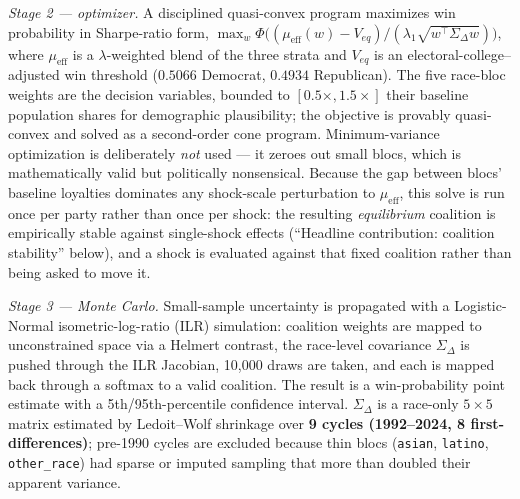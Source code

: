 \documentclass[11pt]{article}
\begin{document}
\emph{Stage 2 --- optimizer.} A disciplined quasi-convex program maximizes win
probability in Sharpe-ratio form,
$\max_w \Phi\!\big((\mu_{\text{eff}}(w)-V_{eq})/(\lambda_1\sqrt{w^\top\Sigma_\Delta
w})\big)$, where $\mu_{\text{eff}}$ is a $\lambda$-weighted blend of the three
strata and $V_{eq}$ is an electoral-college--adjusted win threshold
($0.5066$ Democrat, $0.4934$ Republican). The five race-bloc weights are the
decision variables, bounded to $[0.5\times,1.5\times]$ their baseline
population shares for demographic plausibility; the objective is provably
quasi-convex and solved as a second-order cone program. Minimum-variance
optimization is deliberately \emph{not} used --- it zeroes out small blocs, which
is mathematically valid but politically nonsensical. Because the gap between
blocs' baseline loyalties dominates any shock-scale perturbation to
$\mu_{\text{eff}}$, this solve is run once per party rather than once per
shock: the resulting \emph{equilibrium} coalition is empirically stable
against single-shock effects (``Headline contribution: coalition stability''
below), and a shock is evaluated against that fixed coalition rather than
being asked to move it.

\emph{Stage 3 --- Monte Carlo.} Small-sample uncertainty is propagated with a
Logistic-Normal isometric-log-ratio (ILR) simulation: coalition weights are
mapped to unconstrained space via a Helmert contrast, the race-level covariance
$\Sigma_\Delta$ is pushed through the ILR Jacobian, 10{,}000 draws are taken, and
each is mapped back through a softmax to a valid coalition. The result is a
win-probability point estimate with a 5th/95th-percentile confidence interval.
$\Sigma_\Delta$ is a race-only $5\times5$ matrix estimated by Ledoit--Wolf
shrinkage over \textbf{9 cycles (1992--2024, 8 first-differences)}; pre-1990
cycles are excluded because thin blocs (\texttt{asian}, \texttt{latino},
\texttt{other\_race}) had sparse or imputed sampling that more than doubled their
apparent variance.
\end{document}
